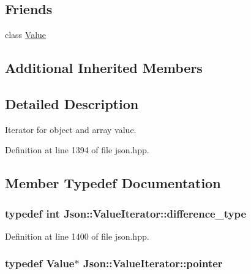 \subsection*{Friends}
\begin{DoxyCompactItemize}
\item 
class \hyperlink{class_json_1_1_value_iterator_aeceedf6e1a7d48a588516ce2b1983d6f}{Value}
\end{DoxyCompactItemize}
\subsection*{Additional Inherited Members}


\subsection{Detailed Description}
Iterator for object and array value. 

Definition at line 1394 of file json.\-hpp.



\subsection{Member Typedef Documentation}
\hypertarget{class_json_1_1_value_iterator_a2be1a9aa60bbfc8812e9dd1a7f1a8786}{
\subsubsection[{difference\-\_\-type}]{\setlength{\rightskip}{0pt plus 5cm}typedef int {\bf Json\-::\-Value\-Iterator\-::difference\-\_\-type}}}\label{class_json_1_1_value_iterator_a2be1a9aa60bbfc8812e9dd1a7f1a8786}


Definition at line 1400 of file json.\-hpp.

\hypertarget{class_json_1_1_value_iterator_acec45feb1ef1f3bf81240157d06d5432}{
\subsubsection[{pointer}]{\setlength{\rightskip}{0pt plus 5cm}typedef {\bf Value}$\ast$ {\bf Json\-::\-Value\-Iterator\-::pointer}}}\label{class_json_1_1_value_iterator_acec45feb1ef1f3bf81240157d06d5432}



